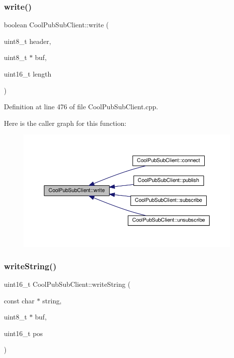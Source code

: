 \subsubsection{\texorpdfstring{write()}{write()}}
{\footnotesize\ttfamily boolean Cool\+Pub\+Sub\+Client\+::write (\begin{DoxyParamCaption}\item[{uint8\+\_\+t}]{header,  }\item[{uint8\+\_\+t $\ast$}]{buf,  }\item[{uint16\+\_\+t}]{length }\end{DoxyParamCaption})\hspace{0.3cm}{\ttfamily [private]}}



Definition at line 476 of file Cool\+Pub\+Sub\+Client.\+cpp.

Here is the caller graph for this function\+:\nopagebreak
\begin{figure}[H]
\begin{center}
\leavevmode
\includegraphics[width=350pt]{class_cool_pub_sub_client_a7a8e4854a1846eaa668046d3854d47ad_icgraph}
\end{center}
\end{figure}
\mbox{\label{class_cool_pub_sub_client_a0e3d7e776d4cf4427f9569b28868905a}} 
\subsubsection{\texorpdfstring{write\+String()}{writeString()}}
{\footnotesize\ttfamily uint16\+\_\+t Cool\+Pub\+Sub\+Client\+::write\+String (\begin{DoxyParamCaption}\item[{const char $\ast$}]{string,  }\item[{uint8\+\_\+t $\ast$}]{buf,  }\item[{uint16\+\_\+t}]{pos }\end{DoxyParamCaption})\hspace{0.3cm}{\ttfamily [private]}}



